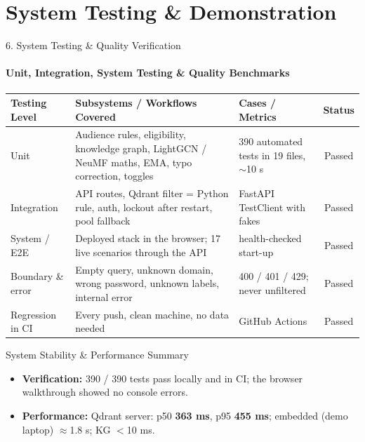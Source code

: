 \documentclass[aspectratio=169, 11pt]{beamer}
\begin{document}
\section{System Testing \& Demonstration}

\begin{frame}{6. System Testing \& Quality Verification}
    \framesubtitle{Unit, Integration, System Testing \& Quality Benchmarks}
    \scriptsize
    \renewcommand{\arraystretch}{1.2}
    \begin{tabular}{L{2.4cm} L{5.4cm} L{3.9cm} c}
        \toprule
        \textbf{Testing Level} & \textbf{Subsystems / Workflows Covered} & \textbf{Cases / Metrics} & \textbf{Status} \\
        \midrule
        Unit & Audience rules, eligibility, knowledge graph, LightGCN / NeuMF maths, EMA, typo correction, toggles & 390 automated tests in 19 files, $\sim$10 s & Passed \\
        Integration & API routes, Qdrant filter = Python rule, auth, lockout after restart, pool fallback & FastAPI TestClient with fakes & Passed \\
        System / E2E & Deployed stack in the browser; 17 live scenarios through the API & health-checked start-up & Passed \\
        Boundary \& error & Empty query, unknown domain, wrong password, unknown labels, internal error & 400 / 401 / 429; never unfiltered & Passed \\
        Regression in CI & Every push, clean machine, no data needed & GitHub Actions & Passed \\
        \bottomrule
    \end{tabular}

    \vspace{0.25cm}
    \begin{block}{System Stability \& Performance Summary}
        \scriptsize
        \begin{itemize}
            \item \textbf{Verification:} 390 / 390 tests pass locally and in CI; the browser walkthrough showed no console errors.
            \item \textbf{Performance:} Qdrant server: p50 \textbf{363 ms}, p95 \textbf{455 ms}; embedded (demo laptop) $\approx$1.8 s; KG $<$10 ms.
        \end{itemize}
    \end{block}
\end{frame}
\end{document}
